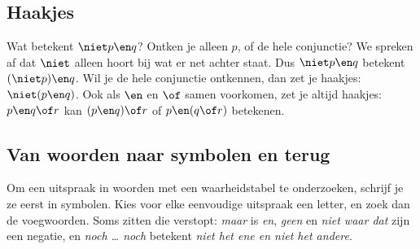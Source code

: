 \begin{oefeningen}
\end{oefeningen}

\subsection{Haakjes}

Wat betekent $\niet p \en q$? Ontken je alleen $p$, of de hele conjunctie? We spreken af dat $\niet$ alleen hoort bij wat er net achter staat. Dus $\niet p \en q$ betekent $(\niet p) \en q$. Wil je de hele conjunctie ontkennen, dan zet je haakjes: $\niet(p \en q)$. Ook als $\en$ en $\of$ samen voorkomen, zet je altijd haakjes: $p \en q \of r$ kan $(p \en q) \of r$ of $p \en (q \of r)$ betekenen.


\begin{oefeningen}
\end{oefeningen}

\subsection{Van woorden naar symbolen en terug}

Om een uitspraak in woorden met een waarheidstabel te onderzoeken, schrijf je ze eerst in symbolen. Kies voor elke eenvoudige uitspraak een letter, en zoek dan de voegwoorden. Soms zitten die verstopt: \textit{maar} is \textit{en}, \textit{geen} en \textit{niet waar dat} zijn een negatie, en \textit{noch \ldots{} noch} betekent \textit{niet het ene en niet het andere}.

